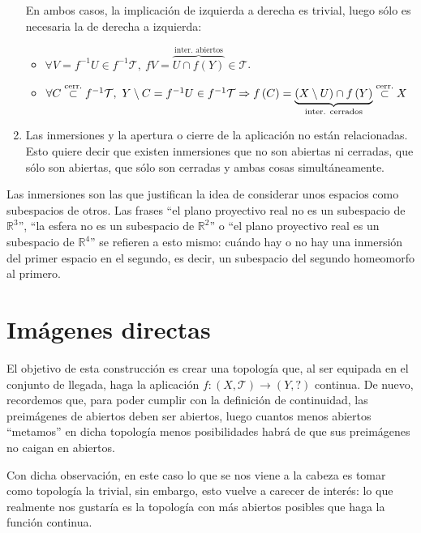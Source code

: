 \begin{obs}
\begin{enumerate}
    \begin{demo}
    En ambos casos, la implicación de izquierda a derecha es trivial, luego sólo es necesaria la de derecha a izquierda:
    \begin{itemize}
        \item 
        $\forall V = f^{-1}U \in f^{-1}\mathcal{T}, \ fV = \overbrace{U \cap f\left( Y \right)}^{\text{inter. abiertos}} \in \mathcal{T}$.
        \item 
        $\forall C \cerr  f^{-1}\mathcal{T}, \ Y\setminus C = f^{-1} U \in f^{-1}\mathcal{T} \Rightarrow f\left( C \right) = \underbrace{\left( X\setminus U \right) \cap f\left( Y \right)}_{\text{inter. cerrados}}  \cerr X$ 
    \end{itemize} 
    \end{demo}

    \item Las inmersiones y la apertura o cierre de la aplicación no están relacionadas. Esto quiere decir que existen inmersiones que no son abiertas ni cerradas, que sólo son abiertas, que sólo son cerradas y ambas cosas simultáneamente.
\end{enumerate}
\end{obs}

\begin{obs}
Las inmersiones son las que justifican la idea de considerar unos espacios como subespacios de otros. Las frases ``el plano proyectivo real no es un subespacio de $\mathbb{R}^3$'', ``la esfera no es un subespacio de $\mathbb{R}^2$'' o ``el plano proyectivo real es un subespacio de $\mathbb{R}^4$'' se refieren a esto mismo: cuándo hay o no hay una inmersión del primer espacio en el segundo, es decir, un subespacio del segundo homeomorfo al primero.
\end{obs}

\section{Imágenes directas}%
\label{sec:imagenes_directas}
El objetivo de esta construcción es crear una topología que, al ser equipada en el conjunto de llegada, haga la aplicación $f: (X, \mathcal{T}) \rightarrow \left( Y, ? \right)$ continua. De nuevo, recordemos que, para poder cumplir con la definición de continuidad, las preimágenes de abiertos deben ser abiertos, luego cuantos menos abiertos ``metamos'' en dicha topología menos posibilidades habrá de que sus preimágenes no caigan en abiertos.

Con dicha observación, en este caso lo que se nos viene a la cabeza es tomar como topología la trivial, sin embargo, esto vuelve a carecer de interés: lo que realmente nos gustaría es la topología con más abiertos posibles que haga la función continua.

